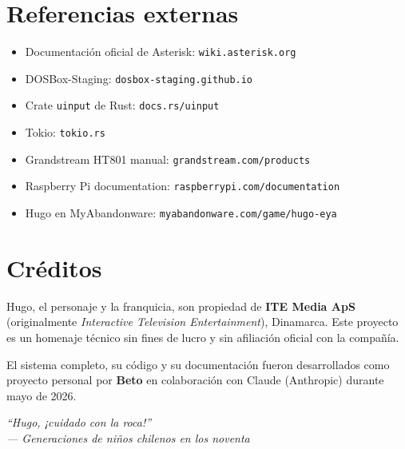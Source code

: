 \section{Referencias externas}

\begin{itemize}
  \item Documentación oficial de Asterisk: \texttt{wiki.asterisk.org}
  \item DOSBox-Staging: \texttt{dosbox-staging.github.io}
  \item Crate \texttt{uinput} de Rust: \texttt{docs.rs/uinput}
  \item Tokio: \texttt{tokio.rs}
  \item Grandstream HT801 manual: \texttt{grandstream.com/products}
  \item Raspberry Pi documentation: \texttt{raspberrypi.com/documentation}
  \item Hugo en MyAbandonware: \texttt{myabandonware.com/game/hugo-eya}
\end{itemize}

\section{Créditos}

Hugo, el personaje y la franquicia, son propiedad de \textbf{ITE Media ApS} (originalmente \emph{Interactive Television Entertainment}), Dinamarca. Este proyecto es un homenaje técnico sin fines de lucro y sin afiliación oficial con la compañía.

El sistema completo, su código y su documentación fueron desarrollados como proyecto personal por \textbf{Beto} en colaboración con Claude (Anthropic) durante mayo de 2026.

\vspace{1cm}

\begin{center}
\itshape\small
``Hugo, ¡cuidado con la roca!''\\
--- Generaciones de niños chilenos en los noventa
\end{center}
